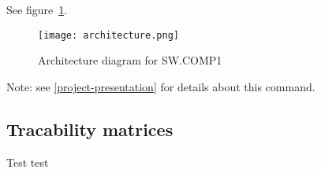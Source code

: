 \documentclass[a4paper]{report}
\makeatletter
\renewcommand\listoftables{%
        \@starttoc{lot}%
}
\renewcommand\listoffigures{%
        \@starttoc{lof}%
}
\renewcommand\tableofcontents{%
        \@starttoc{toc}%
}
\makeatother
\begin{document}
    \tableofcontents

    \listoffigures

    \listoftables

    \label{project-presentation}
    \blindtext[1]

    See figure~\ref{fig:architecture-diagram}.

    \begin{figure}[H]
    \texttt{[image: architecture.png]}
    \caption{Architecture diagram for SW.COMP1}
    \centering\label{fig:architecture-diagram}
    \end{figure}

    \blindtext[1]



    \blindtext[1]

    
    Note: see \ref{project-presentation} for details about this command.


    \blindtext[1]



    \blindtext[1]

\begin{appendices}
    \chapter{Tracability matrices}\label{ch:tracability-matrices}
    Test test
%    

\end{appendices}
\end{document}
